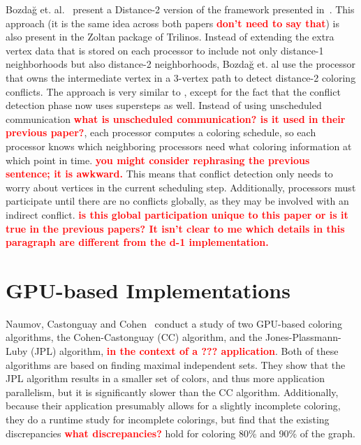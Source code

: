 \documentclass{article}
\newcommand{\todo}[1]{\textcolor{red}{\bf #1}}
\begin{document}
{{Bozda{\u{g}} et. al.~\cite{bozdaug2005parallel,bozdaug2010distributed} present a Distance-2 version of 
the framework presented in~\cite{bozdaug2008framework}. This approach 
(it is the same idea across both papers \todo{don't need to say that}) is also present in the Zoltan package of Trilinos. Instead of extending the extra vertex data
that is stored on each processor to include not only distance-1 neighborhoods but also distance-2 
neighborhoods, Bozda{\u{g}} et. al use the processor that owns the intermediate vertex in a 3-vertex path
to detect distance-2 coloring conflicts. The approach is very similar to \cite{bozdaug2008framework}, 
except for the fact that the conflict detection phase now uses supersteps as well. Instead of using
unscheduled communication \todo{what is unscheduled communication?  is it used in their previous paper?}, each processor computes a coloring schedule, so each processor knows which
neighboring processors need what coloring information at which point in time. 
\todo{you might consider rephrasing the previous sentence; it is awkward.}
This means that conflict
detection only needs to worry about vertices in the current scheduling step. Additionally, processors
must participate until there are no conflicts globally, as they may be involved with an indirect 
conflict. \todo{is this global participation unique to this paper or is it 
true in the previous papers?  It isn't clear to me which details in this 
paragraph are different from the d-1 implementation.}

\section{GPU-based Implementations}

Naumov, Castonguay and Cohen~\cite{naumov2015parallel} conduct a study of two GPU-based coloring 
algorithms, the Cohen-Castonguay (CC) algorithm, and the Jones-Plassmann-Luby (JPL) algorithm, \todo{in the context of a ??? application}. 
Both of these algorithms are based on finding maximal independent sets. They show that the JPL algorithm
results in a smaller set of colors, and thus more application parallelism, but it is significantly 
slower than the CC algorithm. Additionally, because their application presumably allows for a slightly
incomplete coloring, they do a runtime study for incomplete colorings, but find that the existing
discrepancies \todo{what discrepancies?} hold for coloring 80\% and 90\% of the graph.

}}
\end{document}
